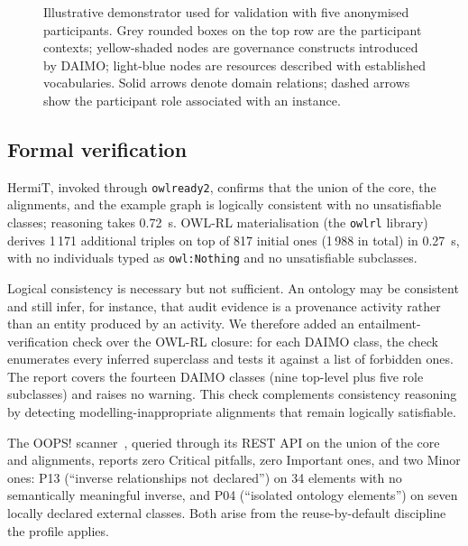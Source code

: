\documentclass[11pt,a4paper]{article}
\newcommand{\code}[1]{\texttt{#1}}
\begin{document}
\begin{figure}[t]
\caption{Illustrative demonstrator used for validation with five anonymised participants. Grey rounded boxes on the top row are the participant contexts; yellow-shaded nodes are governance constructs introduced by DAIMO; light-blue nodes are resources described with established vocabularies. Solid arrows denote domain relations; dashed arrows show the participant role associated with an instance.}
\label{fig:scenario}
\end{figure}

\subsection{Formal verification}\label{sec:eval-engineering}

HermiT, invoked through \code{owlready2}, confirms that the union of the core, the alignments, and the example graph is logically consistent with no unsatisfiable classes; reasoning takes 0.72~s. OWL-RL materialisation (the \code{owlrl} library) derives 1\,171 additional triples on top of 817 initial ones (1\,988 in total) in 0.27~s, with no individuals typed as \code{owl:Nothing} and no unsatisfiable subclasses.

Logical consistency is necessary but not sufficient. An ontology may be consistent and still infer, for instance, that audit evidence is a provenance activity rather than an entity produced by an activity. We therefore added an entailment-verification check over the OWL-RL closure: for each DAIMO class, the check enumerates every inferred superclass and tests it against a list of forbidden ones. The report covers the fourteen DAIMO classes (nine top-level plus five role subclasses) and raises no warning. This check complements consistency reasoning by detecting modelling-inappropriate alignments that remain logically satisfiable.

The OOPS! scanner~\cite{oops14}, queried through its REST API on the union of the core and alignments, reports zero Critical pitfalls, zero Important ones, and two Minor ones: P13 (``inverse relationships not declared'') on 34 elements with no semantically meaningful inverse, and P04 (``isolated ontology elements'') on seven locally declared external classes. Both arise from the reuse-by-default discipline the profile applies.
\end{document}
